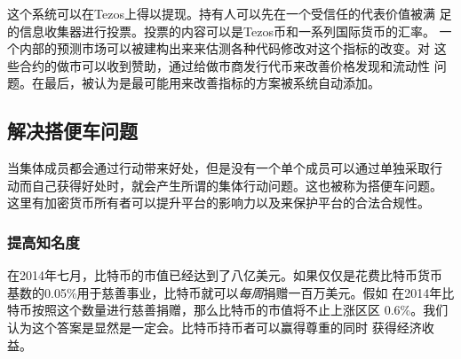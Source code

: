 \documentclass[letterpaper]{article}
\begin{document}
这个系统可以在Tezos上得以提现。持有人可以先在一个受信任的代表价值被满
足的信息收集器进行投票。投票的内容可以是Tezos币和一系列国际货币的汇率。
一个内部的预测市场可以被建构出来来估测各种代码修改对这个指标的改变。对
这些合约的做市可以收到赞助，通过给做市商发行代币来改善价格发现和流动性
问题。在最后，被认为是最可能用来改善指标的方案被系统自动添加。

\subsection{解决搭便车问题}
当集体成员都会通过行动带来好处，但是没有一个单个成员可以通过单独采取行
动而自己获得好处时，就会产生所谓的集体行动问题。这也被称为搭便车问题。
这里有加密货币所有者可以提升平台的影响力以及来保护平台的合法合规性。

\subsubsection{提高知名度}

在2014年七月，比特币的市值已经达到了八亿美元。如果仅仅是花费比特币货币
基数的0.05\%用于慈善事业，比特币就可以\emph{每周}捐赠一百万美元。假如
在2014年比特币按照这个数量进行慈善捐赠，那么比特币的市值将不止上涨区区
0.6\%。我们认为这个答案是显然是一定会。比特币持币者可以赢得尊重的同时
获得经济收益。
\end{document}
